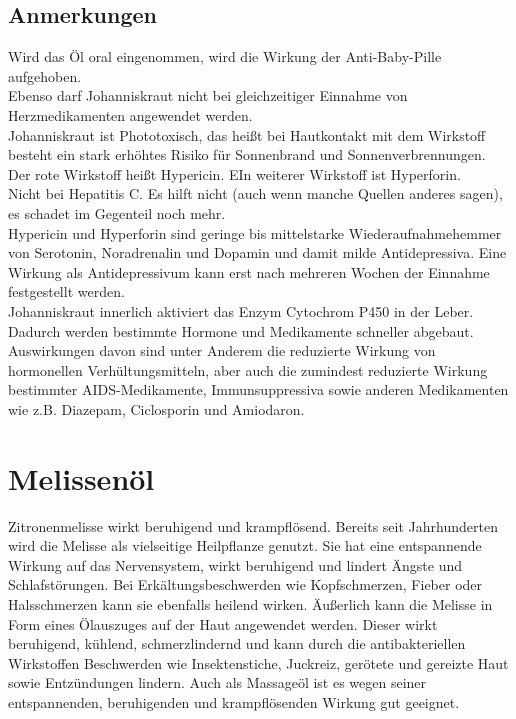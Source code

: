 \subsection{Anmerkungen}

Wird das Öl oral eingenommen, wird die Wirkung der Anti-Baby-Pille aufgehoben.\\
Ebenso darf Johanniskraut nicht bei gleichzeitiger Einnahme von Herzmedikamenten angewendet werden.\\ 
Johanniskraut ist Phototoxisch, das heißt bei Hautkontakt mit dem Wirkstoff besteht ein stark erhöhtes Risiko für Sonnenbrand und Sonnenverbrennungen.\\
Der rote Wirkstoff heißt Hypericin. EIn weiterer Wirkstoff ist Hyperforin. \\
Nicht bei Hepatitis C. Es hilft nicht (auch wenn manche Quellen anderes sagen), es schadet im Gegenteil noch mehr.\\
Hypericin und Hyperforin sind geringe bis mittelstarke Wiederaufnahmehemmer von Serotonin, Noradrenalin und Dopamin und damit milde Antidepressiva. Eine Wirkung als Antidepressivum kann erst nach mehreren Wochen der Einnahme festgestellt werden.\\
Johanniskraut innerlich aktiviert das Enzym Cytochrom P450 in der Leber. Dadurch werden bestimmte Hormone und Medikamente schneller abgebaut. Auswirkungen davon sind unter Anderem die reduzierte Wirkung von hormonellen Verhültungsmitteln, aber auch die zumindest reduzierte Wirkung bestimmter AIDS-Medikamente, Immunsuppressiva sowie anderen Medikamenten wie z.B. Diazepam, Ciclosporin und Amiodaron.






\section{Melissenöl}

Zitronenmelisse wirkt beruhigend und krampflösend. Bereits seit Jahrhunderten wird die Melisse als vielseitige Heilpflanze genutzt. Sie hat eine entspannende Wirkung auf das Nervensystem, wirkt beruhigend und lindert Ängste und Schlafstörungen. Bei Erkältungsbeschwerden wie Kopfschmerzen, Fieber oder Halsschmerzen kann sie ebenfalls heilend wirken. Äußerlich kann die Melisse in Form eines Ölauszuges auf der Haut angewendet werden. Dieser wirkt beruhigend, kühlend, schmerzlindernd und kann durch die antibakteriellen Wirkstoffen Beschwerden wie Insektenstiche, Juckreiz, gerötete und gereizte Haut sowie Entzündungen lindern. Auch als Massageöl ist es wegen seiner entspannenden, beruhigenden und krampflösenden Wirkung gut geeignet.

